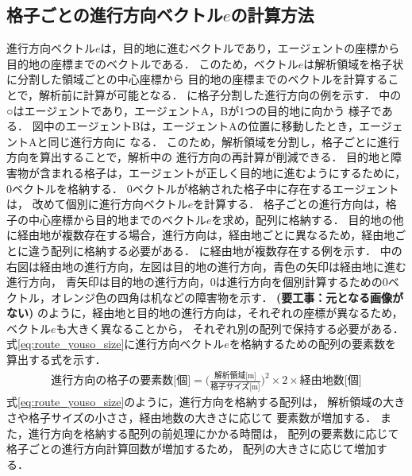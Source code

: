 \subsection{格子ごとの進行方向ベクトル$e$の計算方法}
進行方向ベクトル$e$は，目的地に進むベクトルであり，エージェントの座標から
目的地の座標までのベクトルである．
このため，ベクトル$e$は解析領域を格子状に分割した領域ごとの中心座標から
目的地の座標までのベクトルを計算することで，解析前に計算が可能となる．
に格子分割した進行方向の例を示す．
%
%
中の○はエージェントであり，エージェントA，Bが1つの目的地に向かう
様子である．
図中のエージェントBは，エージェントAの位置に移動したとき，エージェントAと同じ進行方向に
なる．
このため，解析領域を分割し，格子ごとに進行方向を算出することで，解析中の
進行方向の再計算が削減できる．
目的地と障害物が含まれる格子は，エージェントが正しく目的地に進むようにするために，
0ベクトルを格納する．
0ベクトルが格納された格子中に存在するエージェントは，
改めて個別に進行方向ベクトル$e$を計算する．
格子ごとの進行方向は，格子の中心座標から目的地までのベクトル$e$を求め，配列に格納する．
目的地の他に経由地が複数存在する場合，進行方向は，経由地ごとに異なるため，経由地ごとに違う配列に格納する必要がある．
に経由地が複数存在する例を示す．
中の右図は経由地の進行方向，左図は目的地の進行方向，青色の矢印は経由地に進む進行方向，
青矢印は目的地の進行方向，0は進行方向を個別計算するための0ベクトル，オレンジ色の四角は机などの障害物を示す．
\textbf{(要工事：元となる画像がない)}
のように，経由地と目的地の進行方向は，それぞれの座標が異なるため，ベクトル$e$も大きく異なることから，
それぞれ別の配列で保持する必要がある．
式\eqref{eq:route_youso_size}に進行方向ベクトル$e$を格納するための配列の要素数を算出する式を示す．
%
\begin{eqnarray}
 \mbox{進行方向の格子の要素数[個]} = 
 \big( \frac{\mbox{解析領域[m]}}{\mbox{格子サイズ[m]}} \big) ^ 2 \times  2 \times \mbox{経由地数[個]}
 \label{eq:route_youso_size}
\end{eqnarray}
%
式\eqref{eq:route_youso_size}のように，進行方向を格納する配列は，
解析領域の大きさや格子サイズの小ささ，経由地数の大きさに応じて
要素数が増加する．
また，進行方向を格納する配列の前処理にかかる時間は，
配列の要素数に応じて格子ごとの進行方向計算回数が増加するため，
配列の大きさに応じて増加する．

